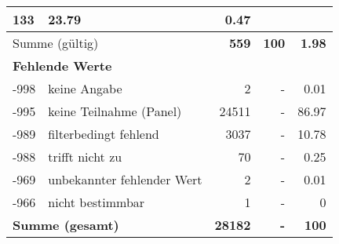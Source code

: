 \begin{longtable}{lXrrr}
       \num{133} &
       \num[round-mode=places,round-precision=2]{23.79} &
         \num[round-mode=places,round-precision=2]{0.47} \\
     \midrule
     \multicolumn{2}{l}{Summe (gültig)} &
       \textbf{\num{559}} &
     \textbf{\num{100}} &
       \textbf{\num[round-mode=places,round-precision=2]{1.98}} \\
     \multicolumn{5}{l}{\textbf{Fehlende Werte}}\\
       -998 &
       keine Angabe &
         \num{2} &
        - &
         \num[round-mode=places,round-precision=2]{0.01} \\
       -995 &
       keine Teilnahme (Panel) &
         \num{24511} &
        - &
         \num[round-mode=places,round-precision=2]{86.97} \\
       -989 &
       filterbedingt fehlend &
         \num{3037} &
        - &
         \num[round-mode=places,round-precision=2]{10.78} \\
       -988 &
       trifft nicht zu &
         \num{70} &
        - &
         \num[round-mode=places,round-precision=2]{0.25} \\
       -969 &
       unbekannter fehlender Wert &
         \num{2} &
        - &
         \num[round-mode=places,round-precision=2]{0.01} \\
       -966 &
       nicht bestimmbar &
         \num{1} &
        - &
         \num[round-mode=places,round-precision=2]{0} \\
     \midrule
     \multicolumn{2}{l}{\textbf{Summe (gesamt)}} &
          \textbf{\num{28182}} &
        \textbf{-} &
        \textbf{\num{100}} \\
     \bottomrule
     \end{longtable}
     
